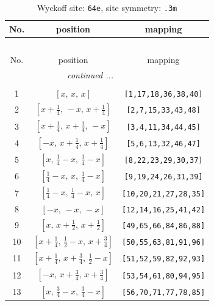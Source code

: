 \documentclass[fleqn,8pt]{jsarticle}
\begin{document}
\begin{longtable}{ccc}
\caption{Wyckoff site: {\tt 64e}, site symmetry: {\tt .3m}}
 \\
 \hline \hline
No. & position & mapping \\ \hline \endfirsthead

\multicolumn{2}{l}{\tablename\ \thetable{}} \\
 \hline \hline
No. & position & mapping \\ \hline \endhead

 \hline \hline
\multicolumn{2}{r}{\footnotesize\it continued ...} \\ \endfoot

 \hline \hline
\multicolumn{2}{r}{} \\ \endlastfoot

1 & $\left[ x,\, x,\, x \right]$ & {\tt [1,17,18,36,38,40]} \\ \hline
2 & $\left[ x + \frac{1}{4},\, - x,\, x + \frac{1}{4} \right]$ & {\tt [2,7,15,33,43,48]} \\ \hline
3 & $\left[ x + \frac{1}{4},\, x + \frac{1}{4},\, - x \right]$ & {\tt [3,4,11,34,44,45]} \\ \hline
4 & $\left[ - x,\, x + \frac{1}{4},\, x + \frac{1}{4} \right]$ & {\tt [5,6,13,32,46,47]} \\ \hline
5 & $\left[ x,\, \frac{1}{4} - x,\, \frac{1}{4} - x \right]$ & {\tt [8,22,23,29,30,37]} \\ \hline
6 & $\left[ \frac{1}{4} - x,\, x,\, \frac{1}{4} - x \right]$ & {\tt [9,19,24,26,31,39]} \\ \hline
7 & $\left[ \frac{1}{4} - x,\, \frac{1}{4} - x,\, x \right]$ & {\tt [10,20,21,27,28,35]} \\ \hline
8 & $\left[ - x,\, - x,\, - x \right]$ & {\tt [12,14,16,25,41,42]} \\ \hline
9 & $\left[ x,\, x + \frac{1}{2},\, x + \frac{1}{2} \right]$ & {\tt [49,65,66,84,86,88]} \\ \hline
10 & $\left[ x + \frac{1}{4},\, \frac{1}{2} - x,\, x + \frac{3}{4} \right]$ & {\tt [50,55,63,81,91,96]} \\ \hline
11 & $\left[ x + \frac{1}{4},\, x + \frac{3}{4},\, \frac{1}{2} - x \right]$ & {\tt [51,52,59,82,92,93]} \\ \hline
12 & $\left[ - x,\, x + \frac{3}{4},\, x + \frac{3}{4} \right]$ & {\tt [53,54,61,80,94,95]} \\ \hline
13 & $\left[ x,\, \frac{3}{4} - x,\, \frac{3}{4} - x \right]$ & {\tt [56,70,71,77,78,85]} \\ \hline

\end{longtable}
\end{document}
